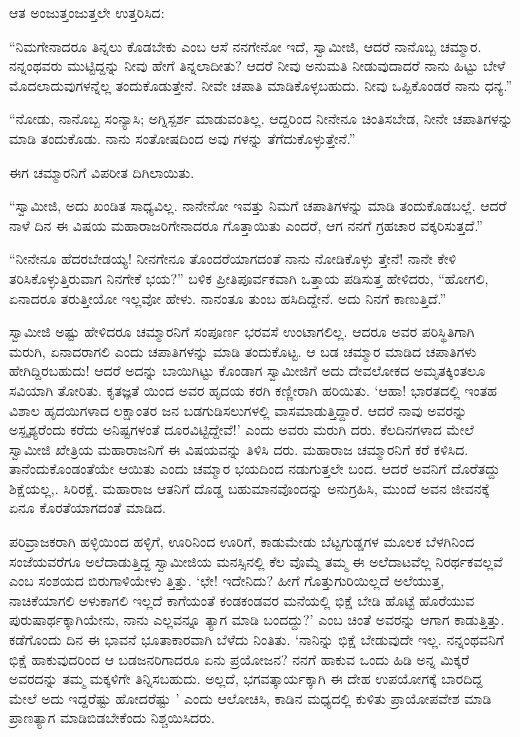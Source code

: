 ಆತ ಅಂಜುತ್ತಂಜುತ್ತಲೇ ಉತ್ತರಿಸಿದ:

“ನಿಮಗೇನಾದರೂ ತಿನ್ನಲು ಕೊಡಬೇಕು ಎಂಬ ಆಸೆ ನನಗೇನೋ ಇದೆ, ಸ್ವಾಮೀಜಿ, ಆದರೆ ನಾನೊಬ್ಬ ಚಮ್ಮಾರ. ನನ್ನಂಥವರು ಮುಟ್ಟಿದ್ದನ್ನು ನೀವು ಹೇಗೆ ತಿನ್ನಲಾದೀತು? ಆದರೆ ನೀವು ಅನುಮತಿ ನೀಡುವುದಾದರೆ ನಾನು ಹಿಟ್ಟು ಬೇಳೆ ಮೊದಲಾದುವುಗಳನ್ನೆಲ್ಲ ತಂದುಕೊಡುತ್ತೇನೆ. ನೀವೇ ಚಪಾತಿ ಮಾಡಿಕೊಳ್ಳಬಹುದು. ನೀವು ಒಪ್ಪಿಕೊಂಡರೆ ನಾನು ಧನ್ಯ.”

“ನೋಡು, ನಾನೊಬ್ಬ ಸಂನ್ಯಾಸಿ; ಅಗ್ನಿಸ್ಪರ್ಶ ಮಾಡುವಂತಿಲ್ಲ. ಆದ್ದರಿಂದ ನೀನೇನೂ ಚಿಂತಿಸಬೇಡ, ನೀನೇ ಚಪಾತಿಗಳನ್ನು ಮಾಡಿ ತಂದುಕೊಡು. ನಾನು ಸಂತೋಷದಿಂದ ಅವು ಗಳನ್ನು ತೆಗೆದುಕೊಳ್ಳುತ್ತೇನೆ.”

ಈಗ ಚಮ್ಮಾರನಿಗೆ ವಿಪರೀತ ದಿಗಿಲಾಯಿತು.

“ಸ್ವಾಮೀಜಿ, ಅದು ಖಂಡಿತ ಸಾಧ್ಯವಿಲ್ಲ. ನಾನೇನೋ ಇವತ್ತು ನಿಮಗೆ ಚಪಾತಿಗಳನ್ನು ಮಾಡಿ ತಂದುಕೊಡಬಲ್ಲೆ. ಆದರೆ ನಾಳೆ ದಿನ ಈ ವಿಷಯ ಮಹಾರಾಜರಿಗೇನಾದರೂ ಗೊತ್ತಾಯಿತು ಎಂದರೆ, ಆಗ ನನಗೆ ಗ್ರಹಚಾರ ವಕ್ಕರಿಸುತ್ತದೆ.”

“ನೀನೇನೂ ಹೆದರಬೇಡಯ್ಯ! ನೀನಗೇನೂ ತೊಂದರೆಯಾಗದಂತೆ ನಾನು ನೋಡಿಕೊಳ್ಳು ತ್ತೇನೆ! ನಾನೇ ಕೇಳಿ ತರಿಸಿಕೊಳ್ಳುತ್ತಿರುವಾಗ ನಿನಗೇಕೆ ಭಯ?” ಬಳಿಕ ಪ್ರೀತಿಪೂರ್ವಕವಾಗಿ ಒತ್ತಾಯ ಪಡಿಸುತ್ತ ಹೇಳಿದರು, “ಹೋಗಲಿ, ಏನಾದರೂ ತರುತ್ತೀಯೋ ಇಲ್ಲವೋ ಹೇಳು. ನಾನಂತೂ ತುಂಬ ಹಸಿದಿದ್ದೇನೆ. ಅದು ನಿನಗೆ ಕಾಣುತ್ತಿದೆ.”

ಸ್ವಾಮೀಜಿ ಅಷ್ಟು ಹೇಳಿದರೂ ಚಮ್ಮಾರನಿಗೆ ಸಂಪೂರ್ಣ ಭರವಸೆ ಉಂಟಾಗಲಿಲ್ಲ. ಆದರೂ ಅವರ ಪರಿಸ್ಥಿತಿಗಾಗಿ ಮರುಗಿ, ಏನಾದರಾಗಲಿ ಎಂದು ಚಪಾತಿಗಳನ್ನು ಮಾಡಿ ತಂದುಕೊಟ್ಟ. ಆ ಬಡ ಚಮ್ಮಾರ ಮಾಡಿದ ಚಪಾತಿಗಳು ಹೇಗಿದ್ದಿರಬಹುದು! ಆದರೆ ಅದನ್ನು ಬಾಯಿಗಿಟ್ಟು ಕೊಂಡಾಗ ಸ್ವಾಮೀಜಿಗೆ ಅದು ದೇವಲೋಕದ ಅಮೃತಕ್ಕಿಂತಲೂ ಸವಿಯಾಗಿ ತೋರಿತು. ಕೃತಜ್ಞತೆ ಯಿಂದ ಅವರ ಹೃದಯ ಕರಗಿ ಕಣ್ಣೀರಾಗಿ ಹರಿಯಿತು. ‘ಆಹಾ! ಭಾರತದಲ್ಲಿ ಇಂತಹ ವಿಶಾಲ ಹೃದಯಿಗಳಾದ ಲಕ್ಷಾಂತರ ಜನ ಬಡಗುಡಿಸಲುಗಳಲ್ಲಿ ವಾಸಮಾಡುತ್ತಿದ್ದಾರೆ. ಆದರೆ ನಾವು ಅವರನ್ನು ಅಸ್ಪೃಶ್ಯರೆಂದು ಕರೆದು ಅನಿಷ್ಟಗಳಂತೆ ದೂರವಿಟ್ಟಿದ್ದೇವೆ!’ ಎಂದು ಅವರು ಮರುಗಿ ದರು. ಕೆಲದಿನಗಳಾದ ಮೇಲೆ ಸ್ವಾಮೀಜಿ ಖೇತ್ರಿಯ ಮಹಾರಾಜನಿಗೆ ಈ ವಿಷಯವನ್ನು ತಿಳಿಸಿ ದರು. ಮಹಾರಾಜ ಚಮ್ಮಾರನಿಗೆ ಕರೆ ಕಳಿಸಿದ. ತಾನೆಂದುಕೊಂಡಂತೆಯೇ ಆಯಿತು ಎಂದು ಚಮ್ಮಾರ ಭಯದಿಂದ ನಡುಗುತ್ತಲೇ ಬಂದ. ಆದರೆ ಅವನಿಗೆ ದೊರೆತದ್ದು ಶಿಕ್ಷೆಯಲ್ಲ,. ಸಿರಿರಕ್ಷೆ. ಮಹಾರಾಜ ಆತನಿಗೆ ದೊಡ್ಡ ಬಹುಮಾನವೊಂದನ್ನು ಅನುಗ್ರಹಿಸಿ, ಮುಂದೆ ಅವನ ಜೀವನಕ್ಕೆ ಏನೂ ಕೊರತೆಯಾಗದಂತೆ ಮಾಡಿದ.

ಪರಿವ್ರಾಜಕರಾಗಿ ಹಳ್ಳಿಯಿಂದ ಹಳ್ಳಿಗೆ, ಊರಿನಿಂದ ಊರಿಗೆ, ಕಾಡುಮೇಡು ಬೆಟ್ಟಗುಡ್ಡಗಳ ಮೂಲಕ ಬೆಳಗಿನಿಂದ ಸಂಜೆಯವರೆಗೂ ಅಲೆದಾಡುತ್ತಿದ್ದ ಸ್ವಾಮೀಜಿಯ ಮನಸ್ಸಿನಲ್ಲಿ ಕೆಲ ವೊಮ್ಮೆ ತಮ್ಮ ಈ ಅಲೆದಾಟವೆಲ್ಲ ನಿರರ್ಥಕವಲ್ಲವೆ ಎಂಬ ಸಂಶಯದ ಬಿರುಗಾಳಿಯೇಳು ತ್ತಿತ್ತು. ‘ಛೇ! ಇದೇನಿದು? ಹೀಗೆ ಗೊತ್ತುಗುರಿಯಿಲ್ಲದೆ ಅಲೆಯುತ್ತ, ನಾಚಿಕೆಯಾಗಲಿ ಅಳುಕಾಗಲಿ ಇಲ್ಲದೆ ಕಾಗೆಯಂತೆ ಕಂಡಕಂಡವರ ಮನೆಯಲ್ಲಿ ಭಿಕ್ಷೆ ಬೇಡಿ ಹೊಟ್ಟೆ ಹೊರೆಯುವ ಪುರುಷಾರ್ಥಕ್ಕಾಗಿಯೇನು, ನಾನು ಎಲ್ಲವನ್ನೂ ತ್ಯಾಗ ಮಾಡಿ ಬಂದದ್ದು?’ ಎಂಬ ಚಿಂತೆ ಅವರನ್ನು ಆಗಾಗ ಕಾಡುತ್ತಿತ್ತು. ಕಡೆಗೊಂದು ದಿನ ಈ ಭಾವನೆ ಭೂತಾಕಾರವಾಗಿ ಬೆಳೆದು ನಿಂತಿತು. ‘ನಾನಿನ್ನು ಭಿಕ್ಷೆ ಬೇಡುವುದೇ ಇಲ್ಲ. ನನ್ನಂಥವನಿಗೆ ಭಿಕ್ಷೆ ಹಾಕುವುದರಿಂದ ಆ ಬಡಜನರಿಗಾದರೂ ಏನು ಪ್ರಯೋಜನ? ನನಗೆ ಹಾಕುವ ಒಂದು ಹಿಡಿ ಅನ್ನ ಮಿಕ್ಕರೆ ಅವರದನ್ನು ತಮ್ಮ ಮಕ್ಕಳಿಗೇ ತಿನ್ನಿಸಬಹುದು. ಅಲ್ಲದೆ, ಭಗವತ್ಕಾರ್ಯಕ್ಕಾಗಿ ಈ ದೇಹ ಉಪಯೋಗಕ್ಕೆ ಬಾರದಿದ್ದ ಮೇಲೆ ಅದು ಇದ್ದರೆಷ್ಟು ಹೋದರೆಷ್ಟು ’ ಎಂದು ಆಲೋಚಿಸಿ, ಕಾಡಿನ ಮಧ್ಯದಲ್ಲಿ ಕುಳಿತು ಪ್ರಾಯೋಪವೇಶ ಮಾಡಿ ಪ್ರಾಣತ್ಯಾಗ ಮಾಡಿಬಿಡಬೇಕೆಂದು ನಿಶ್ಚಯಿಸಿದರು.

